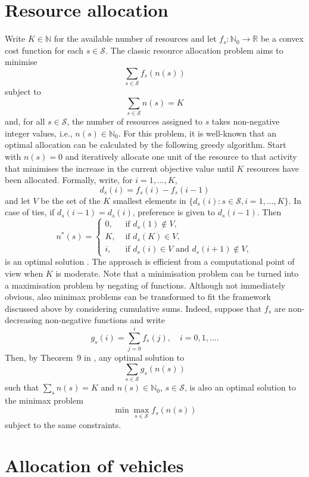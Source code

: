 \documentclass[twoside,11pt]{article}
\begin{document}
\section{Resource allocation}
\label{S:allocation}

Write $K \in \mathbb{N}$ for the available number of resources and let
$f_s: \mathbb{N}_0 \to \mathbb{R}$ be a convex cost function for 
each $s\in \mathcal{S}$. The classic resource allocation problem aims 
to minimise 
\[
\sum_{s\in\mathcal{S}} f_s( n(s) )
\]
subject to 
\[
 \sum_{s\in\mathcal{S}} n(s) = K
\]
and, for all $s\in\mathcal{S}$, the number of resources assigned to 
$s$ takes non-negative integer values, i.e., $n(s)\in \mathbb{N}_0$.
For this problem, it is well-known that an optimal allocation can be 
calculated by the following greedy algorithm.
Start with $n(s) = 0$ and iteratively allocate one unit of the
resource to that activity that minimises the increase in the 
current objective value until $K$ resources have been allocated.
Formally, write, for $i=1, \dots, K$, 
\[
d_s(i) =  f_s(i) - f_s(i-1) 
\]
and let $V$ be the set of the $K$ smallest elements in 
$\{ d_s(i): s\in\mathcal{S}, i = 1, \dots, K \}$. In case of
ties,
if $d_s(i-1) = d_s(i)$,  preference is given to $d_s(i-1)$. Then 
\[
n^*(s) = \left\{ \begin{array}{ll}
0, & \mbox{ if } d_s(1) \not \in V, \\
K, & \mbox{ if } d_s(K) \in V, \\
i, & \mbox{ if } d_s(i) \in V \mbox{ and } d_s(i+1) \not \in V,
\end{array}
\right.
\]
is an optimal solution \cite[Theorem 1]{Katoetal25}. The approach
is efficient from a computational point of view when $K$ is moderate.
Note that a minimisation problem can be turned into a maximisation
problem by negating of functions. Although not immediately obvious,
also minimax problems can be transformed to fit the framework 
discussed above
by considering cumulative sums. Indeed, suppose that $f_s$ are 
non-decreasing non-negative functions and write
\[
g_s(i) = \sum_{j=0}^i f_s(j), \quad i = 0, 1, \dots.
\]
Then, by Theorem~9  in 
\citet{Katoetal25}, any optimal solution to
\[
\sum_{s\in \mathcal{S}} g_s(n(s))
\]
such that $\sum_s n(s) = K$ and $n(s) \in \mathbb{N}_0$,
$s\in \mathcal{S}$,
is also an optimal solution to the minimax problem
\[
\min\max_{s\in \mathcal{S}} f_s(n(s))
\]
subject to the same constraints.


\section{Allocation of vehicles}
\label{S:capacity}
\end{document}
